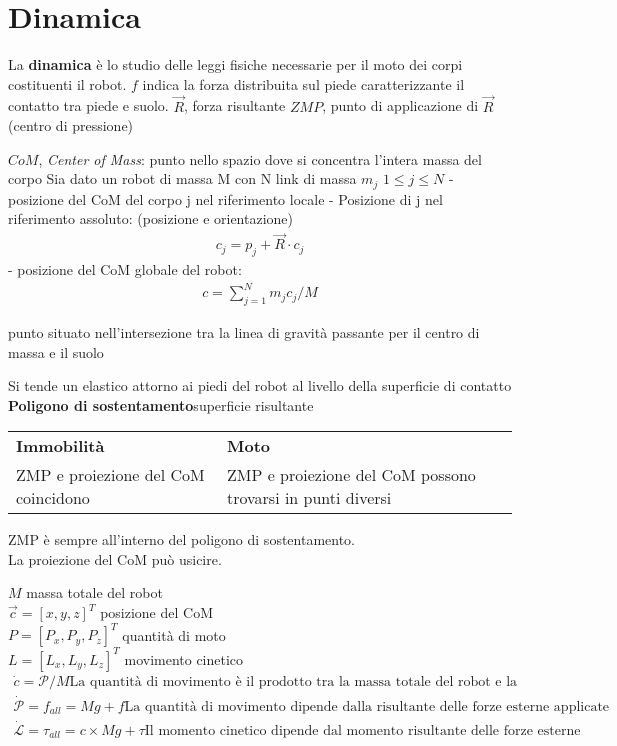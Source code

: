 \documentclass[a4paper,portrait,12pt]{article}
\theoremstyle{definition}
\begin{document}
\section{Dinamica}

La \textbf{dinamica} è lo studio delle leggi fisiche necessarie per il moto dei corpi costituenti il robot.
$f$ indica la forza distribuita sul piede caratterizzante il contatto tra piede e suolo.
$\vec{R}$, forza risultante
$ZMP$, punto di applicazione di $\vec{R}$ (centro di pressione)

$CoM$, \emph{Center of Mass}: punto nello spazio dove si concentra l’intera massa del corpo
Sia dato un robot di massa M con N link di massa $m_j$
$1 \le j \le N$
- posizione del CoM del corpo j nel riferimento locale
- Posizione di j nel riferimento assoluto: (posizione e orientazione)
\begin{align*}
c_j = p_j + \vec{R} \cdot c_j
\end{align*}
- posizione del CoM globale del robot:
\begin{align*}
c = \sum_{j=1}^N m_j c_j /M
\end{align*}

punto situato nell’intersezione tra la linea di
gravità passante per il centro di massa e il
suolo

Si tende un elastico attorno ai piedi del robot al livello della superficie di contatto
\textbf{Poligono di sostentamento}superficie risultante

\begin{table}
\centering
\begin{tabular}{p{.5\linewidth}p{.5\linewidth}}
\textbf{Immobilità} & \textbf{Moto}\\
ZMP e proiezione del CoM coincidono & ZMP e proiezione del CoM possono trovarsi in punti diversi
\end{tabular}
\end{table}

ZMP è sempre all'interno del poligono di sostentamento.\\
La proiezione del CoM può usicire.

$M$ massa totale del robot\\
$\vec{c} = [x,y,z]^T$ posizione del CoM\\
$P = [P_x, P_y, P_z]^T$ quantità di moto\\
$L = [L_x, L_y, L_z]^T$ movimento cinetico\\

\begin{align*}
\dot{c} = \mathcal{P} / M \text{La quantità di movimento è il prodotto tra la massa totale del robot e la velocità del suo CoM}\\
\dot{\mathcal{P}} = f_{all} = Mg + f\text{La quantità di movimento dipende dalla risultante delle forze esterne applicate al robot.}\\
\dot{\mathcal{L}} = \tau_{all} = c \times Mg + \tau \text{Il momento cinetico dipende dal momento risultante delle forze esterne}
\end{align*}
\end{document}
